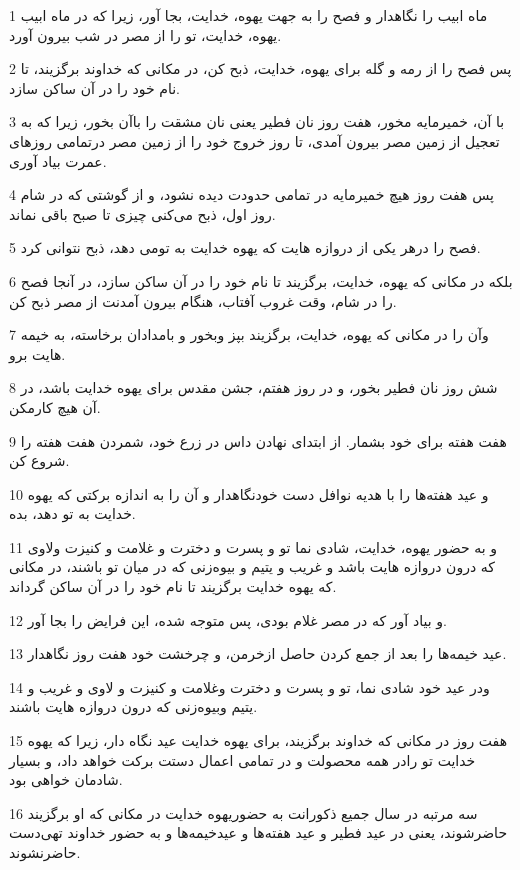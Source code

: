 \par 1 ماه ابیب را نگاهدار و فصح را به جهت یهوه، خدایت، بجا آور، زیرا که در ماه ابیب یهوه، خدایت، تو را از مصر در شب بیرون آورد.
\par 2 پس فصح را از رمه و گله برای یهوه، خدایت، ذبح کن، در مکانی که خداوند برگزیند، تا نام خود را در آن ساکن سازد.
\par 3 با آن، خمیرمایه مخور، هفت روز نان فطیر یعنی نان مشقت را باآن بخور، زیرا که به تعجیل از زمین مصر بیرون آمدی، تا روز خروج خود را از زمین مصر درتمامی روزهای عمرت بیاد آوری.
\par 4 پس هفت روز هیچ خمیرمایه در تمامی حدودت دیده نشود، و از گوشتی که در شام روز اول، ذبح می‌کنی چیزی تا صبح باقی نماند.
\par 5 فصح را درهر یکی از دروازه هایت که یهوه خدایت به تومی دهد، ذبح نتوانی کرد.
\par 6 بلکه در مکانی که یهوه، خدایت، برگزیند تا نام خود را در آن ساکن سازد، در آنجا فصح را در شام، وقت غروب آفتاب، هنگام بیرون آمدنت از مصر ذبح کن.
\par 7 وآن را در مکانی که یهوه، خدایت، برگزیند بپز وبخور و بامدادان برخاسته، به خیمه هایت برو.
\par 8 شش روز نان فطیر بخور، و در روز هفتم، جشن مقدس برای یهوه خدایت باشد، در آن هیچ کارمکن.
\par 9 هفت هفته برای خود بشمار. از ابتدای نهادن داس در زرع خود، شمردن هفت هفته را شروع کن.
\par 10 و عید هفته‌ها را با هدیه نوافل دست خودنگاهدار و آن را به اندازه برکتی که یهوه خدایت به تو دهد، بده.
\par 11 و به حضور یهوه، خدایت، شادی نما تو و پسرت و دخترت و غلامت و کنیزت ولاوی که درون دروازه هایت باشد و غریب و یتیم و بیوه‌زنی که در میان تو باشند، در مکانی که یهوه خدایت برگزیند تا نام خود را در آن ساکن گرداند.
\par 12 و بیاد آور که در مصر غلام بودی، پس متوجه شده، این فرایض را بجا آور.
\par 13 عید خیمه‌ها را بعد از جمع کردن حاصل ازخرمن، و چرخشت خود هفت روز نگاهدار.
\par 14 ودر عید خود شادی نما، تو و پسرت و دخترت وغلامت و کنیزت و لاوی و غریب و یتیم وبیوه‌زنی که درون دروازه هایت باشند.
\par 15 هفت روز در مکانی که خداوند برگزیند، برای یهوه خدایت عید نگاه دار، زیرا که یهوه خدایت تو رادر همه محصولت و در تمامی اعمال دستت برکت خواهد داد، و بسیار شادمان خواهی بود.
\par 16 سه مرتبه در سال جمیع ذکورانت به حضوریهوه خدایت در مکانی که او برگزیند حاضرشوند، یعنی در عید فطیر و عید هفته‌ها و عیدخیمه‌ها و به حضور خداوند تهی‌دست حاضرنشوند. 
